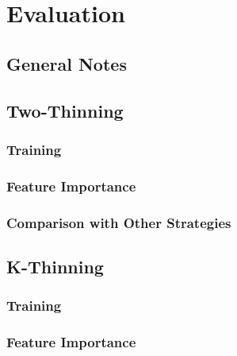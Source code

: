 \chapter{Evaluation}\label{evaluation}


\ifpdf
    \graphicspath{{Chapter3/Figs/Raster/}{Chapter3/Figs/PDF/}{Chapter3/Figs/}}
\else
    \graphicspath{{Chapter3/Figs/Vector/}{Chapter3/Figs/}}
\fi





\section{General Notes}


\section{Two-Thinning}



\subsection{Training}


\subsection{Feature Importance}


\subsection{Comparison with Other Strategies}



\section{K-Thinning}


\subsection{Training}


\subsection{Feature Importance}


